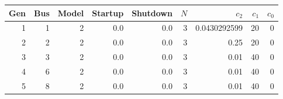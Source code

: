 \begin{tabular}{r r r r r r r r r}\toprule
Gen & Bus & Model & Startup & Shutdown & {$N$} & {$c_2$} & {$c_1$} & {$c_0$} \\ \midrule
1 & 1 & 2 & 0.0 & 0.0 & 3 & 0.0430292599 & 20 & 0 \\ 
2 & 2 & 2 & 0.0 & 0.0 & 3 & 0.25 & 20 & 0 \\ 
3 & 3 & 2 & 0.0 & 0.0 & 3 & 0.01 & 40 & 0 \\ 
4 & 6 & 2 & 0.0 & 0.0 & 3 & 0.01 & 40 & 0 \\ 
5 & 8 & 2 & 0.0 & 0.0 & 3 & 0.01 & 40 & 0 \\ 
\bottomrule\end{tabular}
